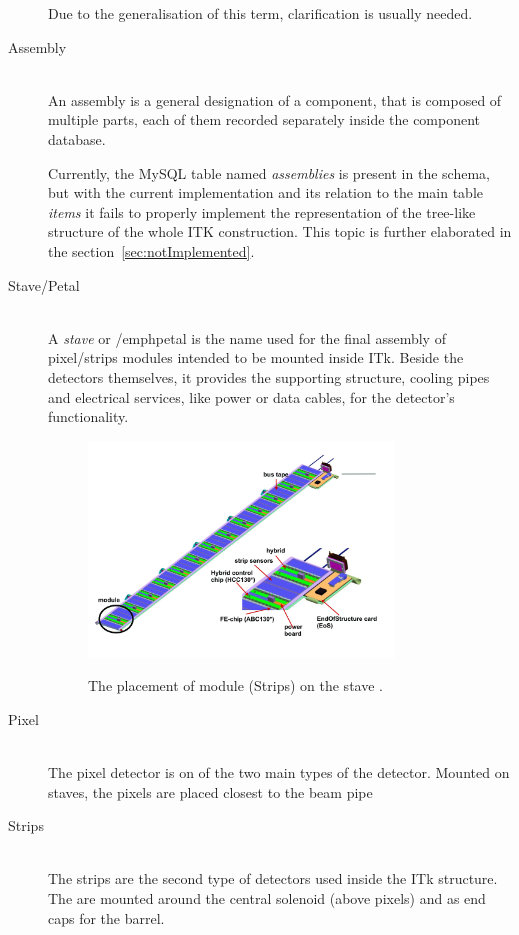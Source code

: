 \begin{description}
	Due to the generalisation of this term, clarification is usually needed.
	
	\item[Assembly] \hfil \\
		An assembly is a general designation of a component, that is composed of multiple parts, each of them recorded separately inside the component database.

		Currently, the MySQL table named \emph{assemblies} is present in the schema, \cite[p82]{sverma} but with the current implementation and its relation to the main table \emph{items} it fails to properly implement the representation of the tree-like structure of the whole ITK construction. This topic is further elaborated in the section~\ref{sec:notImplemented}. 
		
	\item[Stave/Petal] \hfil \\
		A \emph{stave} or /emph{petal} is the name used for the final assembly of pixel/strips modules intended to be mounted inside ITk. Beside the detectors themselves, it provides the supporting structure, cooling pipes and electrical services, like power or data cables, for the detector's functionality. \cite[p20]{sverma}
		
	
		\begin{figure}[!ht]
			\centering
			\includegraphics[width=0.8\textwidth]{img/moduleOnStave.jpg}\\	
			\caption{The placement of module (Strips) on the stave \cite[slide 14]{lankfordReviewStrips}.}
		\end{figure}


	\item[Pixel] \hfil \\
		The pixel detector is on of the two main types of the detector. Mounted on staves, the pixels are placed closest to the beam pipe
	\item[Strips] \hfil \\
		The strips are the second type of detectors used inside the ITk structure. The are mounted around the central solenoid (above pixels) and as end caps for the barrel.


\end{description}
